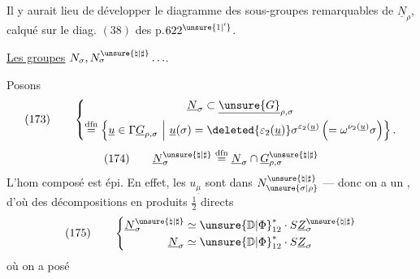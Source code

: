 Il y aurait lieu de développer le diagramme des sous-groupes
remarquables de \(\underline N_\rho\), calqué sur
le diag. \((38)\) des p.\(622^{\unsure{1|'}}\).



 \uline{Les groupes} \(N_\sigma,N_\sigma^{\unsure{\natural|\sharp}}\ldots\).

Posons
\[
(173)\qquad
\left\{
\begin{gathered}
\underline N_\sigma\subset\underline{\unsure{G}}_{\rho,\sigma}\\
\mathrel{\overset{\mathrm{dfn}}{=}}
\left\{\underline u\in\Gamma\underline G_{\rho,\sigma}\ \middle|\
\underline u(\sigma)=
\deleted{\varepsilon_2(\underline u)}
\sigma^{\varepsilon_2(\underline u)}
\left(=\omega^{\nu_2(\underline u)}\sigma\right)\right\}.
\end{gathered}
\right.
\]
\[
(174)\qquad
\underline N_\sigma^{\unsure{\natural|\sharp}}
\mathrel{\overset{\mathrm{dfn}}{=}}
\underline N_\sigma\cap\underline G_{\rho,\sigma}^{\unsure{\natural|\sharp}}
\]
L'hom composé
est épi. En effet, les \(u_{\underline\mu}\) sont dans
\(N_{\unsure{\sigma|\rho}}^{\unsure{\natural|\sharp}}\) --- donc on a un 
,
d'où des décompositions en produits \(\frac12\) directs
\[
(175)\qquad
\left\{
\begin{aligned}
\underline N_\sigma^{\unsure{\natural|\sharp}}
&\simeq\unsure{\mathbb D|\Phi}_{12}^{*}\cdot S\underline Z_\sigma^{\unsure{\natural|\sharp}}\\
\underline N_\sigma
&\simeq\unsure{\mathbb D|\Phi}_{12}^{*}\cdot S\underline Z_\sigma
\end{aligned}
\right.
\]
où on a posé
